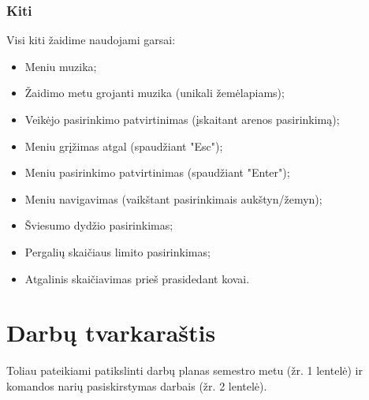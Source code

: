 \documentclass{VUMIFPSkursinis}
\begin{document}
\subsubsection{Kiti}
Visi kiti žaidime naudojami garsai:

\begin{itemize}
    \item Meniu muzika;
    \item Žaidimo metu grojanti muzika (unikali žemėlapiams);
    \item Veikėjo pasirinkimo patvirtinimas (įskaitant arenos pasirinkimą);
    \item Meniu grįžimas atgal (spaudžiant "Esc");
    \item Meniu pasirinkimo patvirtinimas (spaudžiant "Enter");
    \item Meniu navigavimas (vaikštant pasirinkimais aukštyn/žemyn);
    \item Šviesumo dydžio pasirinkimas;
    \item Pergalių skaičiaus limito pasirinkimas;
    \item Atgalinis skaičiavimas prieš prasidedant kovai.
\end{itemize}



\section{Darbų tvarkaraštis}
Toliau pateikiami patikslinti darbų planas semestro metu (žr. 1 lentelė) ir komandos narių pasiskirstymas darbais (žr. 2 lentelė).
\end{document}

